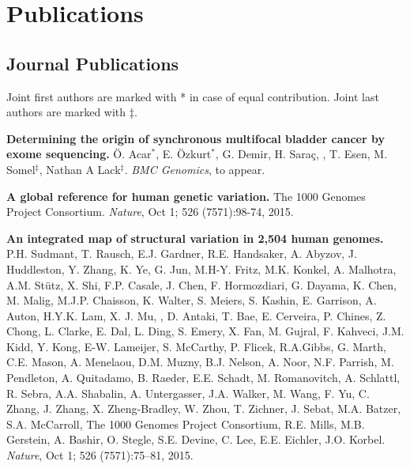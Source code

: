\section{\sc Publications}
                                       
                                       \vspace{-0.5cm}
                                       
                                       \subsection{\small \sc Journal Publications}
                                       \vspace{-0.6cm}
                                       
                                       \small{
                                         Joint first authors are marked with * in case of equal contribution. Joint last authors are marked with $\ddag$.
                                       }


  \vspace{-.2cm}        
  {\bf Determining the origin of synchronous multifocal bladder cancer by exome sequencing.} 
  Ö. Acar$^*$, E. Özkurt$^*$, G. Demir, H. Saraç, \calkan{}, T. Esen, M. Somel$^\ddag$, Nathan A Lack$^\ddag$.
 {\em BMC Genomics}, to appear.

  \vspace{-.2cm}        
  {\bf A global reference for human genetic variation.} The 1000 Genomes Project Consortium.  {\em Nature}, Oct 1; 526 (7571):98-74, 2015.

  \vspace{-.2cm}        
  {\bf An integrated map of structural variation in 2,504 human genomes.}
  P.H. Sudmant, T. Rausch, E.J. Gardner,  R.E. Handsaker, A. Abyzov, J. Huddleston, Y. Zhang, K. Ye, G. Jun, M.H-Y. Fritz, M.K. Konkel, A. Malhotra, A.M. Stütz, X. Shi, F.P. Casale, J. Chen, 
  F. Hormozdiari, G. Dayama, K. Chen, M. Malig, M.J.P. Chaisson, K. Walter, S. Meiers, S. Kashin, E. Garrison, A. Auton, H.Y.K. Lam, X. J. Mu, \calkan, D. Antaki, T. Bae, E. Cerveira, P. Chines, Z. Chong, 
  L. Clarke, E. Dal, L. Ding, S. Emery, X. Fan, M. Gujral, F. Kahveci, J.M. Kidd, Y. Kong, E-W. Lameijer, S. McCarthy, P. Flicek, R.A.Gibbs, G. Marth, C.E. Mason, A. Menelaou, D.M. Muzny, 
  B.J. Nelson, A. Noor, N.F. Parrish, M. Pendleton, A. Quitadamo, B. Raeder, E.E. Schadt, M. Romanovitch, A. Schlattl, R. Sebra, A.A. Shabalin, A. Untergasser, 
  J.A. Walker, M. Wang, F. Yu, C. Zhang, J. Zhang, X. Zheng-Bradley, W. Zhou, T. Zichner, J. Sebat, M.A. Batzer, S.A. McCarroll, 
  The 1000 Genomes Project Consortium, R.E. Mills, M.B. Gerstein, A. Bashir, O. Stegle, S.E. Devine, C. Lee, E.E. Eichler, J.O. Korbel. 
  {\em Nature}, Oct 1; 526 (7571):75–81, 2015.



